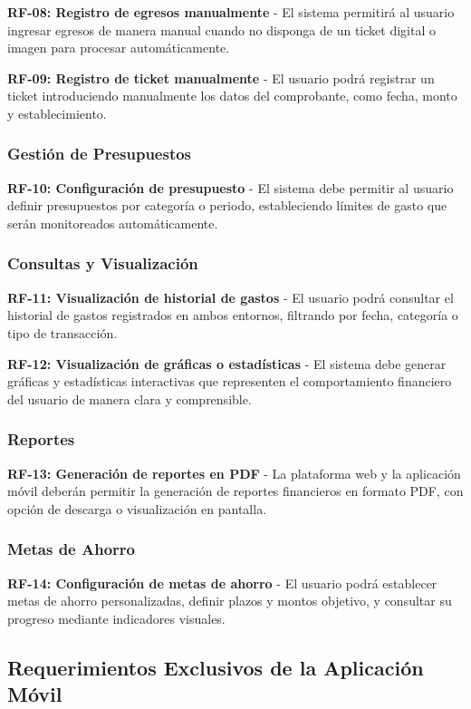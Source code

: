 \textbf{RF-08: Registro de egresos manualmente} - El sistema permitirá al usuario ingresar egresos de manera manual cuando no disponga de un ticket digital o imagen para procesar automáticamente.

\textbf{RF-09: Registro de ticket manualmente} - El usuario podrá registrar un ticket introduciendo manualmente los datos del comprobante, como fecha, monto y establecimiento.

\subsubsection{Gestión de Presupuestos}
\textbf{RF-10: Configuración de presupuesto} - El sistema debe permitir al usuario definir presupuestos por categoría o periodo, estableciendo límites de gasto que serán monitoreados automáticamente.

\subsubsection{Consultas y Visualización}
\textbf{RF-11: Visualización de historial de gastos} - El usuario podrá consultar el historial de gastos registrados en ambos entornos, filtrando por fecha, categoría o tipo de transacción.

\textbf{RF-12: Visualización de gráficas o estadísticas} - El sistema debe generar gráficas y estadísticas interactivas que representen el comportamiento financiero del usuario de manera clara y comprensible.

\subsubsection{Reportes}
\textbf{RF-13: Generación de reportes en PDF} - La plataforma web y la aplicación móvil deberán permitir la generación de reportes financieros en formato PDF, con opción de descarga o visualización en pantalla.

\subsubsection{Metas de Ahorro}
\textbf{RF-14: Configuración de metas de ahorro} - El usuario podrá establecer metas de ahorro personalizadas, definir plazos y montos objetivo, y consultar su progreso mediante indicadores visuales.

\subsection{Requerimientos Exclusivos de la Aplicación Móvil}

